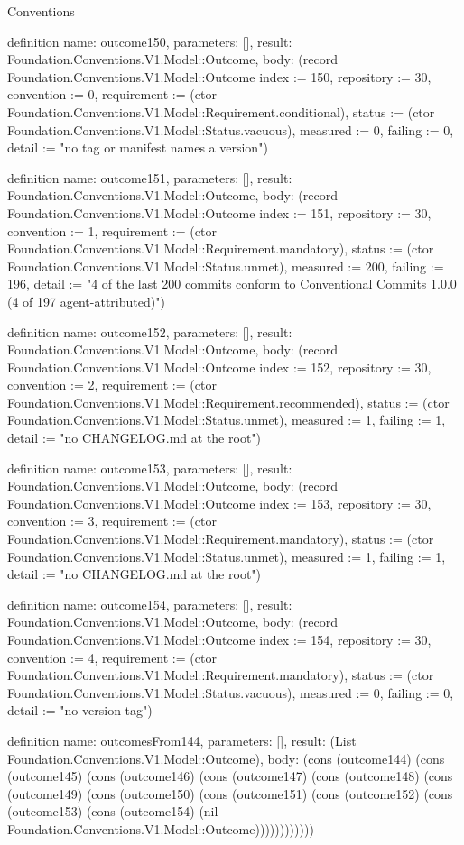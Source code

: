 \begin{lexlean}{Conventions}
\begin{semanticmodule}
definition{
  name: outcome150,
  parameters: [],
  result: Foundation.Conventions.V1.Model::Outcome,
  body: (record Foundation.Conventions.V1.Model::Outcome {index := 150, repository := 30, convention := 0, requirement := (ctor Foundation.Conventions.V1.Model::Requirement.conditional), status := (ctor Foundation.Conventions.V1.Model::Status.vacuous), measured := 0, failing := 0, detail := "no tag or manifest names a version"})
}

definition{
  name: outcome151,
  parameters: [],
  result: Foundation.Conventions.V1.Model::Outcome,
  body: (record Foundation.Conventions.V1.Model::Outcome {index := 151, repository := 30, convention := 1, requirement := (ctor Foundation.Conventions.V1.Model::Requirement.mandatory), status := (ctor Foundation.Conventions.V1.Model::Status.unmet), measured := 200, failing := 196, detail := "4 of the last 200 commits conform to Conventional Commits 1.0.0 (4 of 197 agent-attributed)"})
}

definition{
  name: outcome152,
  parameters: [],
  result: Foundation.Conventions.V1.Model::Outcome,
  body: (record Foundation.Conventions.V1.Model::Outcome {index := 152, repository := 30, convention := 2, requirement := (ctor Foundation.Conventions.V1.Model::Requirement.recommended), status := (ctor Foundation.Conventions.V1.Model::Status.unmet), measured := 1, failing := 1, detail := "no CHANGELOG.md at the root"})
}

definition{
  name: outcome153,
  parameters: [],
  result: Foundation.Conventions.V1.Model::Outcome,
  body: (record Foundation.Conventions.V1.Model::Outcome {index := 153, repository := 30, convention := 3, requirement := (ctor Foundation.Conventions.V1.Model::Requirement.mandatory), status := (ctor Foundation.Conventions.V1.Model::Status.unmet), measured := 1, failing := 1, detail := "no CHANGELOG.md at the root"})
}

definition{
  name: outcome154,
  parameters: [],
  result: Foundation.Conventions.V1.Model::Outcome,
  body: (record Foundation.Conventions.V1.Model::Outcome {index := 154, repository := 30, convention := 4, requirement := (ctor Foundation.Conventions.V1.Model::Requirement.mandatory), status := (ctor Foundation.Conventions.V1.Model::Status.vacuous), measured := 0, failing := 0, detail := "no version tag"})
}

definition{
  name: outcomesFrom144,
  parameters: [],
  result: (List Foundation.Conventions.V1.Model::Outcome),
  body: (cons (outcome144) (cons (outcome145) (cons (outcome146) (cons (outcome147) (cons (outcome148) (cons (outcome149) (cons (outcome150) (cons (outcome151) (cons (outcome152) (cons (outcome153) (cons (outcome154) (nil Foundation.Conventions.V1.Model::Outcome))))))))))))
}


\end{semanticmodule}
\end{lexlean}
